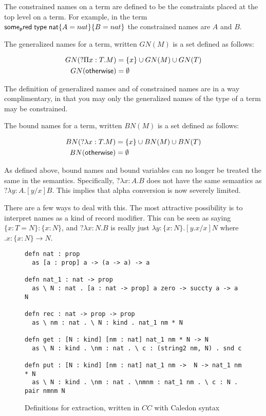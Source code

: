 The constrained names on a term are defined to be the constraints placed at the top level on 
a term.  For example, in the term $\mathsf{some_pred} \; \mathsf{type} \; \mathsf{nat} \{ A = nat \} \{ B = nat \}$ the constrained names are $A$ and $B$.  

\begin{definition}
The generalized names for a term, written $GN(M)$ is a set defined as follows:

\begin{align}
GN(?\Pi x : T . M) &= \{ x \} \cup GN(M) \cup GN(T)
\\
GN(\mathsf{otherwise}) &= \emptyset
\end{align}
\end{definition}

The definition of generalized names and of constrained names are in a way complimentary, in that
you may only the generalized names of the type of a term may be constrained.

\begin{definition}
The bound names for a term, written $BN(M)$ is a set defined as follows:

\begin{align} 
BN(?\lambda x : T . M) &= \{ x \} \cup BN(M) \cup BN(T)
\\
BN(\mathsf{otherwise}) &= \emptyset
\end{align}

\end{definition}

As defined above, bound names and bound variables can no longer be treated the same in the semantics.  
Specifically, $?\lambda x : A . B$ does not have the same semantics as $?\lambda y : A . [y / x] B$.  
This implies that alpha conversion is now severely limited.  

There are a few ways to deal with this.  
The most attractive possibility is to interpret names as a kind of record modifier.
This can be seen as saying $\{ x : T = N \} : \{ x : N \}$, 
and $?\lambda x : N . B$ is really just $\lambda y : \{ x : N \} . [ y.x / x ] N$ where $ .x : \{ x : N \} \rightarrow N$.

\begin{figure}[H]
\begin{lstlisting}
defn nat : prop 
  as [a : prop] a -> (a -> a) -> a

defn nat_1 : nat -> prop
  as \ N : nat . [a : nat -> prop] a zero -> succty a -> a N

defn rec : nat -> prop -> prop
  as \ nm : nat . \ N : kind . nat_1 nm * N

defn get : [N : kind] [nm : nat] nat_1 nm * N -> N
  as \ N : kind . \nm : nat . \ c : (string2 nm, N) . snd c

defn put : [N : kind] [nm : nat] nat_1 nm ->  N -> nat_1 nm * N
  as \ N : kind . \nm : nat . \nmnm : nat_1 nm . \ c : N . pair nmnm N
\end{lstlisting}
\caption{Definitions for extraction, written in $CC$ with Caledon syntax}
\label{code:ideal}
\end{figure}

